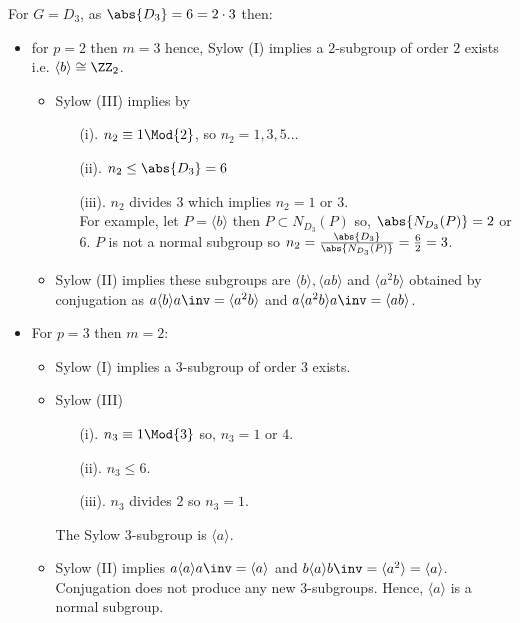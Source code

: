 \documentclass[12pt, a4paper]{article}
\begin{document}
\begin{mdexample}
    For \(G=D_3\), as \(\abs{D_3}=6=2\cdot 3\) then:
    \begin{itemize}
        \item for \(p=2\) then \(m=3\) hence, Sylow (I) implies a \(2\)-subgroup of order \(2\) exists i.e. \(\langle b \rangle \cong \ZZ_2\).
        \begin{itemize}
            \item Sylow (III) implies by
                \begin{enumerate}
                    \item[(i).] \(n_2 \equiv 1 \Mod{2}\), so \(n_2 = 1,3,5 \ldots\)
                    \item[(ii).] \(n_2 \leq \abs{D_3}=6\)
                    \item[(iii).] \(n_2\) divides \(3\) which implies \(n_2 =1\) or \(3\). \\
                    For example, let \(P=\langle b \rangle\) then \(P \subset N_{D_3}(P)\) so, \(\abs{N_{D_3}(P)}=2\) or \(6\). \(P\) is not a normal subgroup so \(n_2 = \frac{\abs{D_3}}{\abs{N_{D_3}(P)}} = \frac{6}{2}= 3\).
                \end{enumerate}
            \item Sylow (II) implies these subgroups are \(\langle b \rangle , \langle ab \rangle\) and \(\langle a^2 b \rangle\) obtained by \\ conjugation as \(a\langle b \rangle a\inv = \langle a^2b \rangle\) and \(a \langle a^2 b \rangle a\inv = \langle ab \rangle\).
        \end{itemize}
        \item For \(p=3\) then \(m=2\):
        \begin{itemize}
            \item Sylow (I) implies a \(3\)-subgroup of order \(3\) exists.
            \item Sylow (III)
            \begin{itemize}
                \item[(i).] \(n_3 \equiv 1 \Mod{3}\) so, \(n_3 =1\) or \(4\).
                \item[(ii).] \(n_3 \leq 6\).
                \item[(iii).] \(n_3\) divides \(2\) so \(n_3=1\).
            \end{itemize}
            The Sylow \(3\)-subgroup is \(\langle a \rangle\).
            \item Sylow (II) implies \(a \langle a \rangle a\inv =\langle a \rangle\) and \(b \langle a \rangle b\inv =\langle a^2 \rangle =\langle a \rangle\). Conjugation does not produce any new \(3\)-subgroups. Hence, \(\langle a \rangle\) is a normal subgroup.
        \end{itemize}
    \end{itemize}
\end{mdexample}
\end{document}

